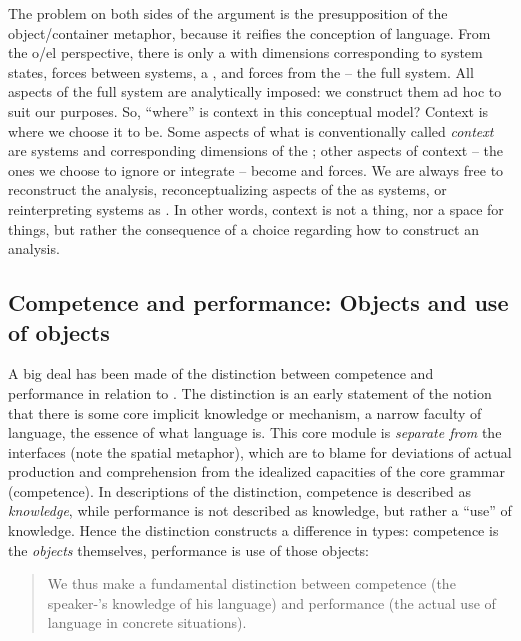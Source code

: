   The problem on both sides of the argument is the presupposition of the object/container metaphor, because it reifies the  conception of language. From the o/el perspective, there is only a  with dimensions corresponding to system states, forces between systems, a , and forces from the  -- the full system. All aspects of the full system are analytically imposed: we construct them ad hoc to suit our purposes. So, “where” is context in this conceptual model? Context is where we choose it to be. Some aspects of what is conventionally called \textit{context} are systems and corresponding dimensions of the ; other aspects of context -- the ones we choose to ignore or integrate -- become  and  forces. We are always free to reconstruct the analysis, reconceptualizing aspects of the  as systems, or reinterpreting systems as . In other words, context is not a thing, nor a space for things, but rather the consequence of a choice regarding how to construct an analysis.

\subsection{Competence and performance: Objects and use of objects}

A big deal has been made of the distinction between competence and performance in relation to  \citep{Chomsky1965}. The distinction is an early statement of the notion that there is some core implicit knowledge or mechanism, a narrow faculty of language, the essence of what language is. This core module is \textit{separate from} the  interfaces (note the spatial metaphor), which are to blame for deviations of actual production and comprehension from the idealized capacities of the core grammar (competence). In descriptions of the distinction, competence is described as \textit{knowledge}, while performance is not described as knowledge, but rather a “use” of knowledge. Hence the distinction constructs a difference in types: competence is the \textit{objects} themselves, performance is use of those objects:

\begin{quote}
We thus make a fundamental distinction between competence (the speaker-'s knowledge of his language) and performance (the actual use of language in concrete situations). \citep[4]{Chomsky1965}
\end{quote}


